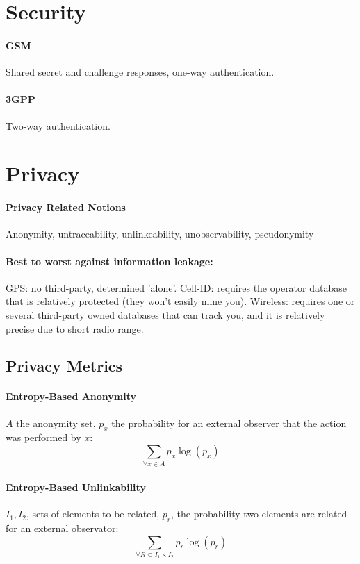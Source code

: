 \documentclass[10pt, a4paper,twocolumn]{scrartcl}
\begin{document}
\section{Security}
\paragraph{GSM} Shared secret and challenge responses, one-way authentication.
\paragraph{3GPP} Two-way authentication.

\section{Privacy}
\paragraph{Privacy Related Notions}Anonymity, untraceability, unlinkeability, unobservability, pseudonymity
\paragraph{Best to worst against information leakage:}
GPS: no third-party, determined 'alone'.
Cell-ID: requires the operator database that is relatively protected (they won't easily mine you).
Wireless: requires one or several third-party owned databases that can track you, and it is relatively precise due to short radio range.

\subsection{Privacy Metrics}

\paragraph{Entropy-Based Anonymity}
$A$ the anonymity set, $p_x$ the probability for an external observer that the action was performed by $x$:
\begin{equation*}
	\sum_{\forall x \in A} p_x \log(p_x)
\end{equation*}

\paragraph{Entropy-Based Unlinkability}
$I_1,I_2$, sets of elements to be related, $p_r$, the probability two elements are related for an external observator:
\begin{equation*}
	\sum_{\forall R \subseteq I_1 \times I_2}p_r \log(p_r)
\end{equation*}
\end{document}
